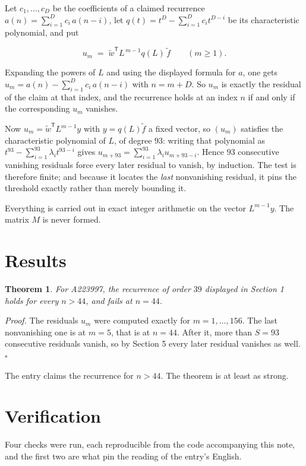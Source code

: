 \documentclass[11pt]{article}
\newtheorem{theorem}{Theorem}
\theoremstyle{definition}
\begin{document}
Let $c_1,\dots,c_D$ be the coefficients of a claimed recurrence $a(n) = \sum_{i=1}^{D} c_i\,a(n-i)$, let $q(t) = t^{D} - \sum_{i=1}^{D} c_i t^{D-i}$ be its characteristic polynomial, and put

\[u_m \;=\; \tilde w^{\mathsf T} L^{\,m-1} q(L)\,\tilde f \qquad (m \ge 1).\]

Expanding the powers of $L$ and using the displayed formula for $a$, one gets $u_m = a(n) - \sum_{i=1}^{D} c_i\,a(n-i)$ with $n = m + D$. So $u_m$ is exactly the residual of the claim at that index, and the recurrence holds at an index $n$ if and only if the corresponding $u_m$ vanishes.

Now $u_m = \tilde w^{\mathsf T} L^{m-1} y$ with $y = q(L)\tilde f$ a fixed vector, so $(u_m)$ satisfies the characteristic polynomial of $L$, of degree $93$: writing that polynomial as $t^{93} - \sum_{i=1}^{93} \lambda_i t^{93-i}$ gives $u_{m+93} = \sum_{i=1}^{93} \lambda_i u_{m+93-i}$. Hence $93$ consecutive vanishing residuals force every later residual to vanish, by induction. The test is therefore finite; and because it locates the {\itshape last} nonvanishing residual, it pins the threshold exactly rather than merely bounding it.

Everything is carried out in exact integer arithmetic on the vector $L^{m-1}y$. The matrix $M$ is never formed.

\section{Results}

\begin{theorem} For A223997, the recurrence of order $39$ displayed in Section 1 holds for every $n > 44$, and fails at $n = 44$.\end{theorem}

{\itshape Proof.} The residuals $u_m$ were computed exactly for $m = 1,\dots,156$. The last nonvanishing one is at $m = 5$, that is at $n = 44$. After it, more than $S = 93$ consecutive residuals vanish, so by Section 5 every later residual vanishes as well. $\square$

The entry claims the recurrence for $n > 44$. The theorem is at least as strong.

\section{Verification}

Four checks were run, each reproducible from the code accompanying this note, and the first two are what pin the reading of the entry's English.
\end{document}

